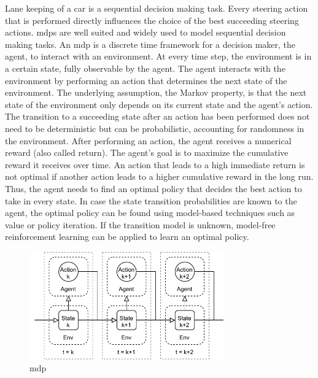 Lane keeping of a car is a sequential decision making task. Every steering action that is performed directly influences the choice of the best succeeding steering actions. \Glspl{mdp} are well suited and widely used to model sequential decision making tasks. An \gls{mdp} is a discrete time framework for a decision maker, the agent, to interact with an environment. At every time step, the environment is in a certain state, fully observable by the agent. The agent interacts with the environment by performing an action that determines the next state of the environment. The underlying assumption, the Markov property, is that the next state of the environment only depends on its current state and the agent's action. The transition to a succeeding state after an action has been performed does not need to be deterministic but can be probabilistic, accounting for randomness in the environment. After performing an action, the agent receives a numerical reward (also called return). The agent's goal is to maximize the cumulative reward it receives over time. An action that leads to a high immediate return is not optimal if another action leads to a higher cumulative reward in the long run. Thus, the agent needs to find an optimal policy that decides the best action to take in every state. In case the state transition probabilities are known to the agent, the optimal policy can be found using model-based techniques such as value or policy iteration. If the transition model is unknown, model-free reinforcement learning can be applied to learn an optimal policy. %

\begin{figure}[htbp]
    \centering
    \includegraphics[width=0.75\textwidth]{figures/MDP.pdf}
    \caption{\acrfull{mdp}}
\end{figure}

